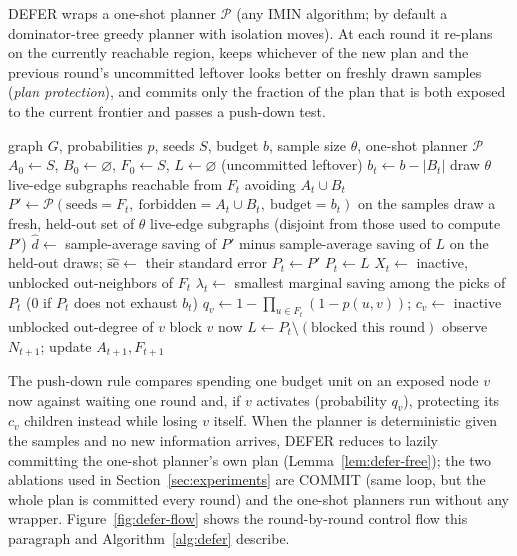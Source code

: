 \documentclass[ijoc,sglanonrev]{informs4}
\begin{document}
DEFER wraps a one-shot planner $\mathcal P$ (any IMIN algorithm; by default
a dominator-tree greedy planner with isolation moves). At each round it
re-plans on the currently reachable region, keeps whichever of the new plan
and the previous round's uncommitted leftover looks better on freshly drawn
samples (\emph{plan protection}), and commits only the fraction of the plan
that is both exposed to the current frontier and passes a push-down test.

\begin{algorithm}[h]
\caption{DEFER}\label{alg:defer}
\begin{algorithmic}[1]
\Require graph $G$, probabilities $p$, seeds $S$, budget $b$, sample size
  $\theta$, one-shot planner $\mathcal P$
\State $A_0\gets S$, $B_0\gets\varnothing$, $F_0\gets S$, $L\gets\varnothing$ (uncommitted leftover)
  \State $b_t\gets b-|B_t|$
  \State draw $\theta$ live-edge subgraphs reachable from $F_t$ avoiding $A_t\cup B_t$
  \State $P'\gets\mathcal P(\text{seeds}=F_t,\ \text{forbidden}=A_t\cup B_t,\ \text{budget}=b_t)$ on the samples
  \State draw a fresh, held-out set of $\theta$ live-edge subgraphs (disjoint from those used to compute $P'$)
  \State $\hat d\gets$ sample-average saving of $P'$ minus sample-average saving of $L$ on the held-out draws; $\widehat{\mathrm{se}}\gets$ their standard error
   
    \State $P_t\gets P'$
  \Else
    \State $P_t\gets L$
  \EndIf
  \State $X_t\gets$ inactive, unblocked out-neighbors of $F_t$
  \State $\lambda_t\gets$ smallest marginal saving among the picks of $P_t$ (0 if $P_t$ does not exhaust $b_t$)
  \label{alg:pushdown-start}
    \State $q_v\gets 1-\prod_{u\in F_t}(1-p(u,v))$; $c_v\gets$ inactive unblocked out-degree of $v$
     
      \State block $v$ now
    \EndIf
  \EndFor\label{alg:pushdown-end}
  \State $L\gets P_t\setminus(\text{blocked this round})$
  \State observe $N_{t+1}$; update $A_{t+1},F_{t+1}$
\EndFor
\end{algorithmic}
\end{algorithm}

The push-down rule compares spending one budget unit on an exposed node $v$
now against waiting one round and, if $v$ activates (probability $q_v$),
protecting its $c_v$ children instead while losing $v$ itself. When the
planner is deterministic given the samples and no new information arrives,
DEFER reduces to lazily committing the one-shot planner's own plan
(Lemma~\ref{lem:defer-free}); the two ablations used in
Section~\ref{sec:experiments} are COMMIT (same loop, but the whole plan is
committed every round) and the one-shot planners run without any wrapper.
Figure~\ref{fig:defer-flow} shows the round-by-round control flow this
paragraph and Algorithm~\ref{alg:defer} describe.
\end{document}
